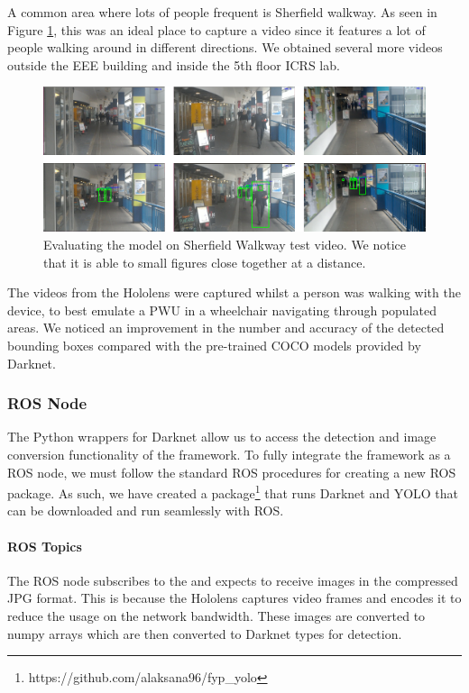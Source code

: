 A common area where lots of people frequent is Sherfield walkway. As seen in Figure \ref{fig:yoloSherfield}, this was an ideal place to capture a video since it features a lot of people walking around in different directions. We obtained several more videos outside the EEE building and inside the 5th floor ICRS lab.

\begin{figure}[ht]
    \centering
    \includegraphics[width=0.95\linewidth]{img/chapter5_implementation/yoloWalkwayMultiple.png}
    \caption{Evaluating the model on Sherfield Walkway test video. We notice that it is able to small figures close together at a distance.}
    \label{fig:yoloSherfield}
\end{figure}

The videos from the Hololens were captured whilst a person was walking with the device, to best emulate a PWU in a wheelchair navigating through populated areas. We noticed an improvement in the number and accuracy of the detected bounding boxes compared with the pre-trained COCO models provided by Darknet. 

\subsubsection{ROS Node} \label{sec:nodeYOLO}
The Python wrappers for Darknet allow us to access the detection and image conversion functionality of the framework. To fully integrate the framework as a ROS node, we must follow the standard ROS procedures for creating a new ROS package. As such, we have created a package\footnote{https://github.com/alaksana96/fyp\_yolo} that runs Darknet and YOLO that can be downloaded and run seamlessly with ROS.

\paragraph{ROS Topics} The ROS node subscribes to the  and expects to receive images in the compressed JPG format. This is because the Hololens captures video frames and encodes it to reduce the usage on the network bandwidth. These images are converted to numpy arrays which are then converted to Darknet  types for detection. 

